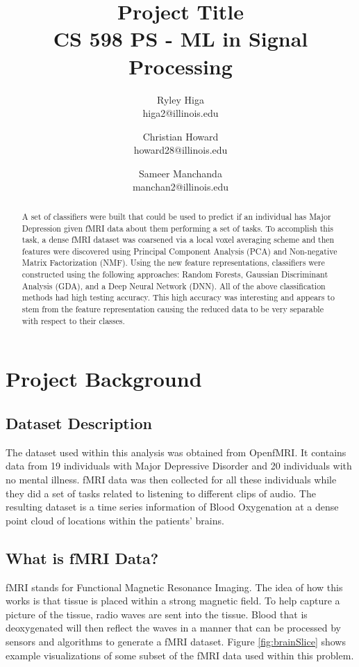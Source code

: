 \documentclass{article}[12pt]
\title{Project Title \\ CS 598 PS - ML in Signal Processing}
\author{
Ryley Higa \\ higa2@illinois.edu
\and 
Christian Howard \\ howard28@illinois.edu
\and
Sameer Manchanda \\ manchan2@illinois.edu
}
\date{} %
\begin{document}
   
   \maketitle
   \begin{abstract}
   A set of classifiers were built that could be used to predict if an individual has Major Depression given fMRI data about them performing a set of tasks. To accomplish this task, a dense fMRI dataset was coarsened via a local voxel averaging scheme and then features were discovered using Principal Component Analysis (PCA) and Non-negative Matrix Factorization (NMF). Using the new feature representations, classifiers were constructed using the following approaches: Random Forests, Gaussian Discriminant Analysis (GDA), and a Deep Neural Network (DNN). All of the above classification methods had high testing accuracy. This high accuracy was interesting and appears to stem from the feature representation causing the reduced data to be very separable with respect to their classes.
   \end{abstract}
   \newpage
   
   \tableofcontents
   \newpage
   
   \section{Project Background}
   \subsection{Dataset Description}
   The dataset used within this analysis was obtained from OpenfMRI. It contains data from 19 individuals with Major Depressive Disorder and 20 individuals with no mental illness. fMRI data was then collected for all these individuals while they did a set of tasks related to listening to different clips of audio. The resulting dataset is a time series information of Blood Oxygenation at a dense point cloud of locations within the patients’ brains.
   
   \subsection{What is fMRI Data?}
   fMRI stands for Functional Magnetic Resonance Imaging. The idea of how this works is that tissue is placed within a strong magnetic field. To help capture a picture of the tissue, radio waves are sent into the tissue. Blood that is deoxygenated will then reflect the waves in a manner that can be processed by sensors and algorithms to generate a fMRI dataset. Figure \ref{fig:brainSlice} shows example visualizations of some subset of the fMRI data used within this problem.
   
\end{document}
